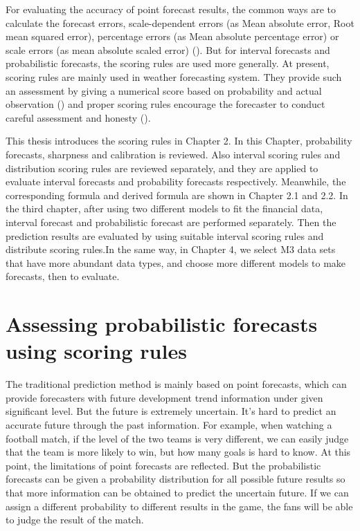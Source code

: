 \documentclass{monashthesis}
\theoremstyle{definition}
\theoremstyle{definition}
\theoremstyle{definition}
\theoremstyle{remark}
\begin{document}
For evaluating the accuracy of point forecast results, the common ways
are to calculate the forecast errors, scale-dependent errors (as Mean
absolute error, Root mean squared error), percentage errors (as Mean
absolute percentage error) or scale errors (as mean absolute scaled
error) (\textcite{RA18}). But for interval forecasts and probabilistic
forecasts, the scoring rules are used more generally. At present,
scoring rules are mainly used in weather forecasting system. They
provide such an assessment by giving a numerical score based on
probability and actual observation (\textcite{W96}) and proper scoring
rules encourage the forecaster to conduct careful assessment and honesty
(\textcite{GR07}).

This thesis introduces the scoring rules in Chapter 2. In this Chapter,
probability forecasts, sharpness and calibration is reviewed. Also
interval scoring rules and distribution scoring rules are reviewed
separately, and they are applied to evaluate interval forecasts and
probability forecasts respectively. Meanwhile, the corresponding formula
and derived formula are shown in Chapter 2.1 and 2.2. In the third
chapter, after using two different models to fit the financial data,
interval forecast and probabilistic forecast are performed separately.
Then the prediction results are evaluated by using suitable interval
scoring rules and distribute scoring rules.In the same way, in Chapter
4, we select M3 data sets that have more abundant data types, and choose
more different models to make forecasts, then to evaluate.

\chapter{Assessing probabilistic forecasts using scoring
rules}\label{assessing-probabilistic-forecasts-using-scoring-rules}

The traditional prediction method is mainly based on point forecasts,
which can provide forecasters with future development trend information
under given significant level. But the future is extremely uncertain.
It's hard to predict an accurate future through the past information.
For example, when watching a football match, if the level of the two
teams is very different, we can easily judge that the team is more
likely to win, but how many goals is hard to know. At this point, the
limitations of point forecasts are reflected. But the probabilistic
forecasts can be given a probability distribution for all possible
future results so that more information can be obtained to predict the
uncertain future. If we can assign a different probability to different
results in the game, the fans will be able to judge the result of the
match.
\end{document}
